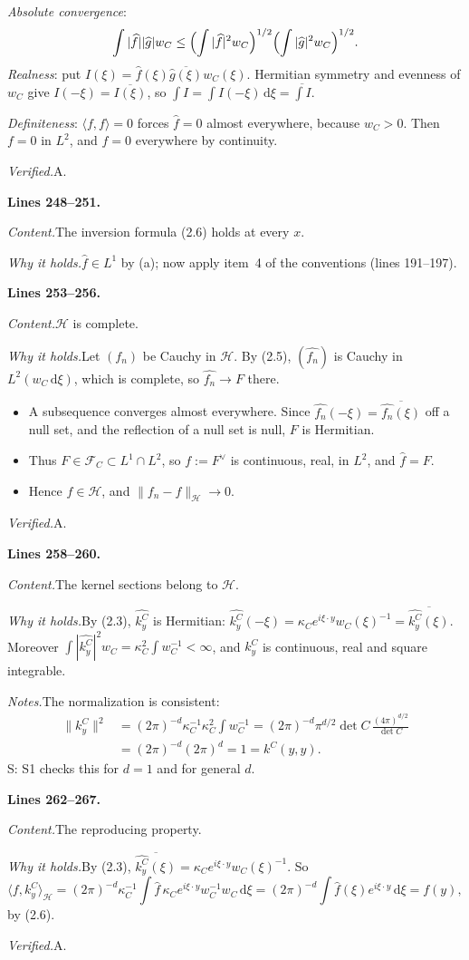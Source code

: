 \documentclass[11pt]{amsart}
\newcommand{\dd}{\,\mathrm{d}}
\newcommand{\FC}[1]{\mathcal{F}_{#1}}
\newcommand{\ip}[2]{\langle #1,#2\rangle}
\newcommand{\hatf}[1]{\widehat{#1}}
\newcommand{\src}[1]{\par\bigskip\noindent\textbf{Lines #1.}\enspace}
\newcommand{\content}{\par\smallskip\noindent\textit{Content.}\enspace}
\newcommand{\why}{\par\smallskip\noindent\textit{Why it holds.}\enspace}
\newcommand{\verified}{\par\smallskip\noindent\textit{Verified.}\enspace}
\newcommand{\notes}{\par\smallskip\noindent\textit{Notes.}\enspace}
\newcommand{\tA}{\textsf{A}}
\newcommand{\tS}{\textsf{S}}
\begin{document}
\emph{Absolute convergence}:
\[
\int|\hatf f||\hatf g|w_C\le\Bigl(\int|\hatf f|^2w_C\Bigr)^{1/2}\Bigl(\int|\hatf g|^2w_C\Bigr)^{1/2}.
\]
\emph{Realness}: put $I(\xi)=\hatf f(\xi)\overline{\hatf g(\xi)}w_C(\xi)$. Hermitian symmetry and evenness of $w_C$
give $I(-\xi)=\overline{I(\xi)}$, so $\int I=\int I(-\xi)\dd\xi=\overline{\int I}$.

\emph{Definiteness}: $\ip ff=0$ forces $\hatf f=0$ almost everywhere, because $w_C>0$. Then $f=0$ in $L^2$, and $f=0$
everywhere by continuity.
\verified \tA.

\src{248--251}
\content The inversion formula (2.6) holds at every $x$.
\why $\hatf f\in L^1$ by (a); now apply item~4 of the conventions (lines 191--197).

\src{253--256}
\content $\mathcal H$ is complete.
\why Let $(f_n)$ be Cauchy in $\mathcal H$. By (2.5), $(\hatf{f_n})$ is Cauchy in $L^2(w_C\dd\xi)$, which is complete,
so $\hatf{f_n}\to F$ there.
\begin{itemize}
\item A subsequence converges almost everywhere. Since $\hatf{f_n}(-\xi)=\overline{\hatf{f_n}(\xi)}$ off a null set,
and the reflection of a null set is null, $F$ is Hermitian.
\item Thus $F\in\FC{C}\subset L^1\cap L^2$, so $f:=F^\vee$ is continuous, real, in $L^2$, and $\hatf f=F$.
\item Hence $f\in\mathcal H$, and $\|f_n-f\|_{\mathcal H}\to0$.
\end{itemize}
\verified \tA.

\src{258--260}
\content The kernel sections belong to $\mathcal H$.
\why By (2.3), $\hatf{k^C_y}$ is Hermitian:
$\hatf{k^C_y}(-\xi)=\kappa_Ce^{i\xi\cdot y}w_C(\xi)^{-1}=\overline{\hatf{k^C_y}(\xi)}$. Moreover
$\int|\hatf{k^C_y}|^2w_C=\kappa_C^2\int w_C^{-1}<\infty$, and $k^C_y$ is continuous, real and square integrable.
\notes The normalization is consistent:
\begin{align*}
\|k^C_y\|^2&=(2\pi)^{-d}\kappa_C^{-1}\kappa_C^2\int w_C^{-1}
=(2\pi)^{-d}\pi^{d/2}\det C\,\frac{(4\pi)^{d/2}}{\det C}\\
&=(2\pi)^{-d}(2\pi)^d=1=k^C(y,y).
\end{align*}
\tS: S1 checks this for $d=1$ and for general $d$.

\src{262--267}
\content The reproducing property.
\why By (2.3), $\overline{\hatf{k^C_y}(\xi)}=\kappa_Ce^{i\xi\cdot y}w_C(\xi)^{-1}$. So
\[
\ip f{k^C_y}_{\mathcal H}=(2\pi)^{-d}\kappa_C^{-1}\int\hatf f\,\kappa_Ce^{i\xi\cdot y}w_C^{-1}w_C\dd\xi
=(2\pi)^{-d}\int\hatf f(\xi)e^{i\xi\cdot y}\dd\xi=f(y),
\]
by (2.6).
\verified \tA.
\end{document}
